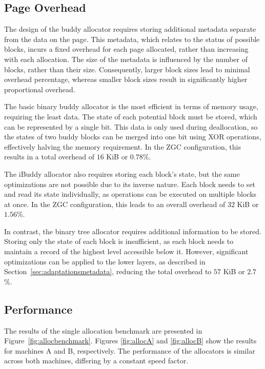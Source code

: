 
\subsection{Page Overhead}
The design of the buddy allocator requires storing additional metadata separate from the data on the page. This metadata, which relates to the status of possible blocks, incurs a fixed overhead for each page allocated, rather than increasing with each allocation. The size of the metadata is influenced by the number of blocks, rather than their size. Consequently, larger block sizes lead to minimal overhead percentage, whereas smaller block sizes result in significantly higher proportional overhead.

The basic binary buddy allocator is the most efficient in terms of memory usage, requiring the least data. The state of each potential block must be stored, which can be represented by a single bit. This data is only used during deallocation, so the states of two buddy blocks can be merged into one bit using XOR operations, effectively halving the memory requirement. In the ZGC configuration, this results in a total overhead of $16$ KiB or $0.78$\%.

The iBuddy allocator also requires storing each block's state, but the same optimizations are not possible due to its inverse nature. Each block needs to set and read its state individually, as operations can be executed on multiple blocks at once. In the ZGC configuration, this leads to an overall overhead of $32$ KiB or $1.56$\%.

In contrast, the binary tree allocator requires additional information to be stored. Storing only the state of each block is insufficient, as each block needs to maintain a record of the highest level accessible below it. However, significant optimizations can be applied to the lower layers, as described in Section~\ref{sec:adaptationsmetadata}, reducing the total overhead to $57$ KiB or $2.7$\%.

\subsection{Performance}
The results of the single allocation benchmark are presented in Figure~\ref{fig:allocbenchmark}. Figures \ref{fig:allocA} and \ref{fig:allocB} show the results for machines A and B, respectively. The performance of the allocators is similar across both machines, differing by a constant speed factor.

